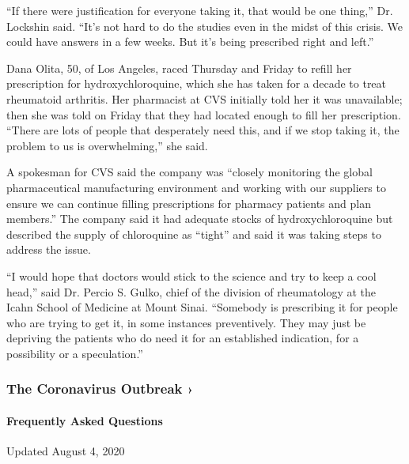 ``If there were justification for everyone taking it, that would be one
thing,'' Dr. Lockshin said. ``It's not hard to do the studies even in
the midst of this crisis. We could have answers in a few weeks. But it's
being prescribed right and left.''

Dana Olita, 50, of Los Angeles, raced Thursday and Friday to refill her
prescription for hydroxychloroquine, which she has taken for a decade to
treat rheumatoid arthritis. Her pharmacist at CVS initially told her it
was unavailable; then she was told on Friday that they had located
enough to fill her prescription. ``There are lots of people that
desperately need this, and if we stop taking it, the problem to us is
overwhelming,'' she said.

A spokesman for CVS said the company was ``closely monitoring the global
pharmaceutical manufacturing environment and working with our suppliers
to ensure we can continue filling prescriptions for pharmacy patients
and plan members.'' The company said it had adequate stocks of
hydroxychloroquine but described the supply of chloroquine as ``tight''
and said it was taking steps to address the issue.

``I would hope that doctors would stick to the science and try to keep a
cool head,'' said Dr. Percio S. Gulko, chief of the division of
rheumatology at the Icahn School of Medicine at Mount Sinai. ``Somebody
is prescribing it for people who are trying to get it, in some instances
preventively. They may just be depriving the patients who do need it for
an established indication, for a possibility or a speculation.''

\href{https://www.nytimes.com/news-event/coronavirus?action=click\&pgtype=Article\&state=default\&region=MAIN_CONTENT_3\&context=storylines_faq}{}

\hypertarget{the-coronavirus-outbreak-}{%
\subsubsection{The Coronavirus Outbreak
›}\label{the-coronavirus-outbreak-}}

\hypertarget{frequently-asked-questions}{%
\paragraph{Frequently Asked
Questions}\label{frequently-asked-questions}}

Updated August 4, 2020

